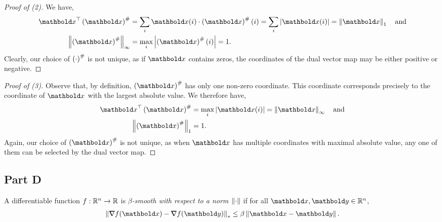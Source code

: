 \documentclass{tufte-handout}
\begin{document}
\begin{proof}[Proof of (2)] We have, \begin{align*}
    \trans{\vx}\dvm{\vx} &= \sum_i \vx(i) \cdot \dvm{\vx}(i) = \sum_i \abs{\vx(i)} = \norm{\vx}_1 \quad \text{and} \\
    \norm{\dvm{\vx}}_\infty &= \max_i \abs{\dvm{\vx}(i)} = 1.
\end{align*} Clearly, our choice of $\left( \cdot \right)^\#$ is not unique, as if $\vx$ contains zeros, the coordinates of the dual vector map may be either positive or negative.
\end{proof}

\begin{proof}[Proof of (3)] Observe that, by definition, $\dvm{\vx}$ has only one non-zero coordinate. This coordinate corresponds precisely to the coordinate of $\vx$ with the largest absolute value. We therefore have, \begin{align*}
    \trans{\vx}\dvm{\vx} &= \max_i \abs{\vx(i)} = \norm{\vx}_\infty \quad \text{and} \\
    \norm{\dvm{\vx}}_1 &= 1.
\end{align*} Again, our choice of $\dvm{\vx}$ is not unique, as when $\vx$ has multiple coordinates with maximal absolute value, any one of them can be selected by the dual vector map.
\end{proof}

\subsection{Part D}
\begin{defn}
A differentiable function $f : \mathbb{R}^n \to \mathbb{R}$ is \emph{$\beta$-smooth with respect to a norm $\left\| \cdot \right\|$} if for all $\vx,\vy \in \R^n$, \begin{align}
    \norm{\grad f(\vx) - \grad f(\vy)}_* \leq \beta \norm{\vx - \vy}. \label{eq:part:2D:1}
\end{align}
\end{defn}
\end{document}
